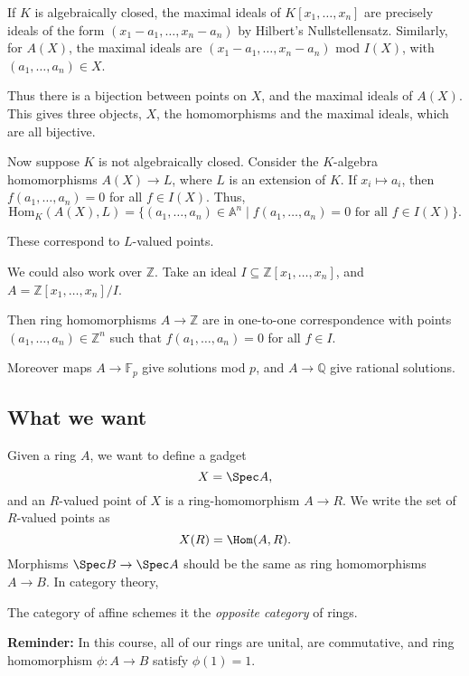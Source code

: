 \documentclass[12pt]{article}
\begin{document}
If $K$ is algebraically closed, the maximal ideals of $K[x_1, \ldots, x_n]$ are precisely ideals of the form $(x_1-a_1, \ldots, x_n-a_n)$ by Hilbert's Nullstellensatz. Similarly, for $A(X)$, the maximal ideals are $(x_1-a_1, \ldots, x_n-a_n)$ mod $I(X)$, with $(a_1, \ldots, a_n) \in X$.

Thus there is a bijection between points on $X$, and the maximal ideals of $A(X)$. This gives three objects, $X$, the homomorphisms and the maximal ideals, which are all bijective.

Now suppose $K$ is not algebraically closed. Consider the $K$-algebra homomorphisms $A(X) \to L$, where $L$ is an extension of $K$. If $x_i \mapsto a_i$, then $f(a_1, \ldots, a_n) = 0$ for all $f \in I(X)$. Thus,
\[
	\mathrm{Hom}_K(A(X), L) = \{(a_1, \ldots, a_n) \in \mathbb{A}^n \mid f(a_1, \ldots, a_n) = 0 \text{ for all } f \in I(X)\}.
\]


These correspond to $L$-valued points.

We could also work over $\mathbb{Z}$. Take an ideal $I \subseteq \mathbb{Z}[x_1, \ldots, x_n]$, and $A = \mathbb{Z}[x_1, \ldots, x_n]/I$.

Then ring homomorphisms $A \to \mathbb{Z}$ are in one-to-one correspondence with points $(a_1, \ldots, a_n) \in \mathbb{Z}^n$ such that $f(a_1, \ldots, a_n) = 0$ for all $f \in I$.

Moreover maps $A \to \mathbb{F}_p$ give solutions mod $p$, and $A \to \mathbb{Q}$ give rational solutions.

\subsection{What we want}%
\label{sub:www}

Given a ring $A$, we want to define a gadget
\[
X = \Spec A,
\]
and an $R$-valued point of $X$ is a ring-homomorphism $A \to R$. We write the set of $R$-valued points as
\[
X(R) = \Hom(A, R).
\]
Morphisms $\Spec B \to \Spec A$ should be the same as ring homomorphisms $A \to B$. In category theory,

\begin{definition}
	The category of affine schemes it the \emph{opposite category} of rings.
\end{definition}

\textbf{Reminder:} In this course, all of our rings are unital, are commutative, and ring homomorphism $\phi : A \to B$ satisfy $\phi(1) = 1$.
\end{document}
